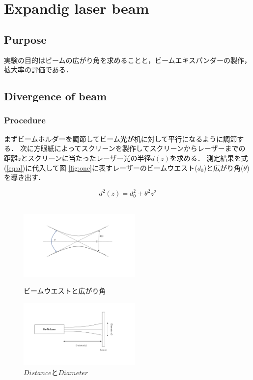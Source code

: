 \documentclass[11pt, a4paper]{jsarticle}
\begin{document}
\section{Expandig laser beam}
\subsection*{Purpose}
実験の目的はビームの広がり角を求めることと，ビームエキスパンダーの製作，拡大率の評価である．
\subsection{Divergence of beam}
\subsubsection{Procedure}
まずビームホルダーを調節してビーム光が机に対して平行になるように調節する．
次に方眼紙によってスクリーンを製作してスクリーンからレーザーまでの距離$z$とスクリーンに当たったレーザー光の半径$d(z)$を求める．
測定結果を式(\ref{eq:a})に代入して図 \ref{fig:one}に表すレーザーのビームウエスト($d_0$)と広がり角($\theta$)を導き出す．

\begin{equation}
    d^2(z) = d_0^2 + \theta^2z^2 \label{eq:a}
\end{equation}\\


\begin{figure}[htbp]
 \begin{minipage}{0.45\hsize}
  \begin{center}
   \includegraphics[width=60mm]{fig1.png}
  \end{center}
  \caption{ビームウエストと広がり角}
  \label{fig:one}
 \end{minipage}
 \begin{minipage}{0.45\hsize}
  \begin{center}
   \includegraphics[width=60mm]{fig2.png}
  \end{center}
  \caption{$Distance$と$Diameter$}
  \label{fig:two}
 \end{minipage}
\end{figure}
\end{document}
